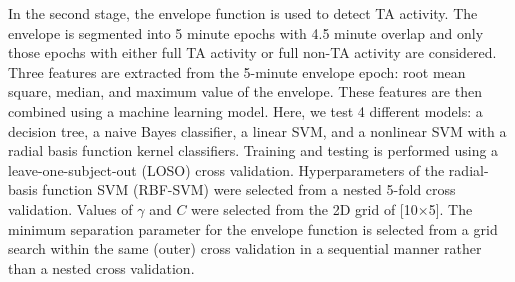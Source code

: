 \documentclass[conference]{IEEEtran}
\begin{document}
In the second stage, the envelope function is used to detect TA activity. The envelope is segmented into 5 minute epochs with 4.5 minute overlap and only those epochs with either full TA activity or full non-TA activity are considered. 
Three features are extracted from the 5-minute envelope epoch: root mean square, median, and maximum value of the envelope.
These features are then combined using a machine learning model. Here, we test 4 different models: a decision tree, a naive Bayes classifier, a linear SVM, and a nonlinear SVM with a radial basis function kernel classifiers.
Training and testing is performed using a leave-one-subject-out (LOSO) cross validation.
Hyperparameters of the radial-basis function SVM (RBF-SVM) were selected from a nested 5-fold cross validation. Values of $\gamma$ and $C$ were selected from the 2D grid of [10$\times$5].
The minimum separation parameter for the envelope function is selected from a grid search within the same (outer) cross validation in a sequential manner rather than a nested cross validation.
\end{document}
